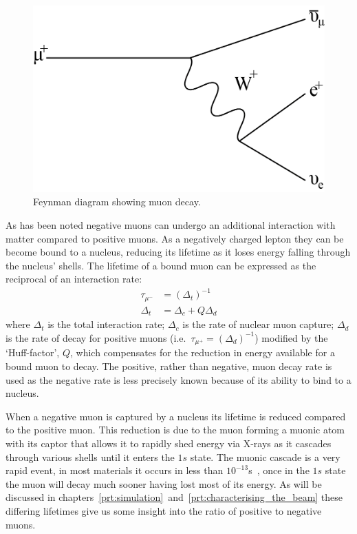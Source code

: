 \begin{figure}[hptb]
  \centering
    \includegraphics[scale=1]{images/muon_decay_feynmann.png}
  \caption{Feynman diagram showing muon decay.}
  \label{fig:muon_decay_feynmann}
\end{figure}

As has been noted negative muons can undergo an additional interaction with matter compared to positive muons. As a negatively charged lepton they can be become bound to a nucleus, reducing its lifetime as it loses energy falling through the nucleus' shells. The lifetime of a bound muon can be expressed as the reciprocal of an interaction rate:
\begin{align}
  \tau_{\mu^-} &= (\Delta_t)^{-1}\\
  \Delta_t &= \Delta_c + Q\Delta_d \label{eq:capture_rate}
\end{align}
where \( \Delta_t \) is the total interaction rate; \( \Delta_c \) is the rate of nuclear muon capture; \( \Delta_d \) is the rate of decay for positive muons (i.e.\ \( \tau_{\mu^+} = (\Delta_d)^{-1}  \)) modified by the `Huff-factor', \( Q \), which compensates for the reduction in energy available for a bound muon to decay. The positive, rather than negative, muon decay rate is used as the negative rate is less precisely known because of its ability to bind to a nucleus.

When a negative muon is captured by a nucleus its lifetime is reduced compared to the positive muon. This reduction is due to the muon forming a muonic atom with its captor that allows it to rapidly shed energy via X-rays as it cascades through various shells until it enters the \( 1s \) state. The muonic cascade is a very rapid event, in most materials it occurs in less than \( 10^{-13}\)s~\cite{review_nuclear_physics_mu_capture_measday}, once in the \( 1s \) state the muon will decay much sooner having lost most of its energy. As will be discussed in chapters~\ref{prt:simulation}~and~\ref{prt:characterising_the_beam} these differing lifetimes give us some insight into the ratio of positive to negative muons.

